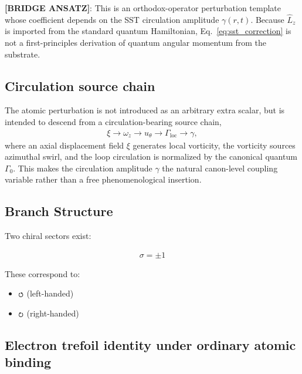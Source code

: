 \documentclass[11pt]{article}
\theoremstyle{definition}
\theoremstyle{plain}
\theoremstyle{remark}
\newcommand{\swirlarrow}{\mathchoice{\mkern-2mu\scriptstyle\boldsymbol{\circlearrowleft}}{\mkern-2mu\scriptstyle\boldsymbol{\circlearrowleft}}{\mkern-2mu\scriptscriptstyle\boldsymbol{\circlearrowleft}}{\mkern-2mu\scriptscriptstyle\boldsymbol{\circlearrowleft}}}
\newcommand{\swirlarrowcw}{\mathchoice{\mkern-2mu\scriptstyle\boldsymbol{\circlearrowright}}{\mkern-2mu\scriptstyle\boldsymbol{\circlearrowright}}{\mkern-2mu\scriptscriptstyle\boldsymbol{\circlearrowright}}{\mkern-2mu\scriptscriptstyle\boldsymbol{\circlearrowright}}}
\begin{document}
        \textbf{[BRIDGE ANSATZ]}: This is an orthodox-operator perturbation template whose coefficient depends on the SST circulation amplitude $\gamma(r,t)$. Because \(\hat L_z\) is imported from the standard quantum Hamiltonian, Eq.~\eqref{eq:sst_correction} is not a first-principles derivation of quantum angular momentum from the substrate.

    \subsection{Circulation source chain}
        The atomic perturbation is not introduced as an arbitrary extra scalar, but is intended to descend from a circulation-bearing source chain,
        \begin{align}
            \xi \rightarrow \omega_z \rightarrow u_\theta \rightarrow \Gamma_{\mathrm{loc}} \rightarrow \gamma,
        \end{align}
        where an axial displacement field $\xi$ generates local vorticity, the vorticity sources azimuthal swirl, and the loop circulation is normalized by the canonical quantum $\Gamma_0$. This makes the circulation amplitude $\gamma$ the natural canon-level coupling variable rather than a free phenomenological insertion.
    
    \subsection{Branch Structure}
        
        Two chiral sectors exist:
        
        \begin{align}
            \sigma = \pm 1
        \end{align}
        
        These correspond to:
        
        \begin{itemize}
            \item $\swirlarrow$ (left-handed)
            \item $\swirlarrowcw$ (right-handed)
        \end{itemize}
    
    \subsection{Electron trefoil identity under ordinary atomic binding}
        \label{subsec:electron_trefoil_atomic_binding}
\end{document}
